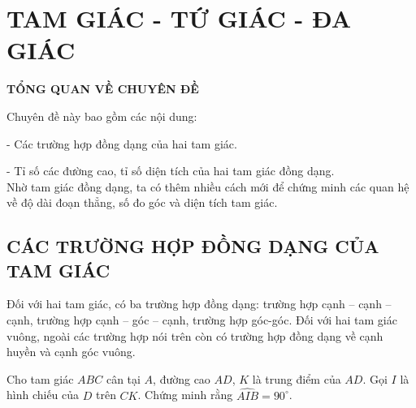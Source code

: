 \section{TAM GIÁC - TỨ GIÁC - ĐA GIÁC}

\begin{center}
 \large \textbf{TỔNG QUAN VỀ CHUYÊN ĐỀ}
\end{center}
Chuyên đề này bao gồm các nội dung:

-  Các trường hợp đồng dạng của hai tam giác.

- Tỉ số các đường cao, tỉ số diện tích của hai tam giác đồng dạng.\\
Nhờ tam giác đồng dạng, ta có thêm nhiều cách mới để chứng minh các quan hệ về độ dài đoạn thẳng, số đo góc và diện tích tam giác.

\subsection{CÁC TRƯỜNG HỢP ĐỒNG DẠNG CỦA TAM GIÁC}
Đối với hai tam giác, có ba trường hợp đồng dạng: trường hợp cạnh – cạnh – cạnh, trường hợp cạnh – góc – cạnh, trường hợp góc-góc. Đối với hai tam giác vuông, ngoài các trường hợp nói trên còn có trường hợp đồng dạng về cạnh huyền và cạnh góc vuông.
\begin{vd}%
    Cho tam giác $ABC$ cân tại $A$, đường cao $AD$, $K$ là trung điểm của $AD$. Gọi $I$ là hình chiếu của $D$ trên $CK$. Chứng minh rằng $ \widehat{ AIB }=90^\circ$.
\end{vd}
